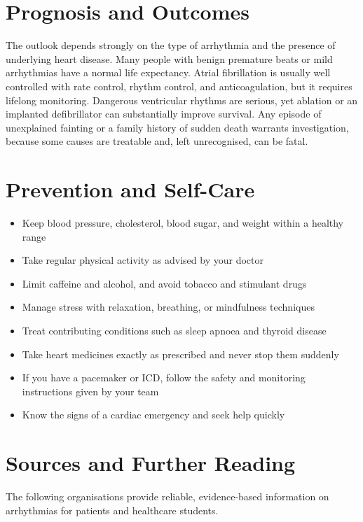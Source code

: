 \section*{Prognosis and Outcomes}
The outlook depends strongly on the type of arrhythmia and the presence of underlying heart disease. Many people with benign premature beats or mild arrhythmias have a normal life expectancy. Atrial fibrillation is usually well controlled with rate control, rhythm control, and anticoagulation, but it requires lifelong monitoring. Dangerous ventricular rhythms are serious, yet ablation or an implanted defibrillator can substantially improve survival. Any episode of unexplained fainting or a family history of sudden death warrants investigation, because some causes are treatable and, left unrecognised, can be fatal.

\section*{Prevention and Self-Care}
\begin{itemize}
    \item Keep blood pressure, cholesterol, blood sugar, and weight within a healthy range
    \item Take regular physical activity as advised by your doctor
    \item Limit caffeine and alcohol, and avoid tobacco and stimulant drugs
    \item Manage stress with relaxation, breathing, or mindfulness techniques
    \item Treat contributing conditions such as sleep apnoea and thyroid disease
    \item Take heart medicines exactly as prescribed and never stop them suddenly
    \item If you have a pacemaker or ICD, follow the safety and monitoring instructions given by your team
    \item Know the signs of a cardiac emergency and seek help quickly
\end{itemize}

\section*{Sources and Further Reading}
The following organisations provide reliable, evidence-based information on arrhythmias for patients and healthcare students.

